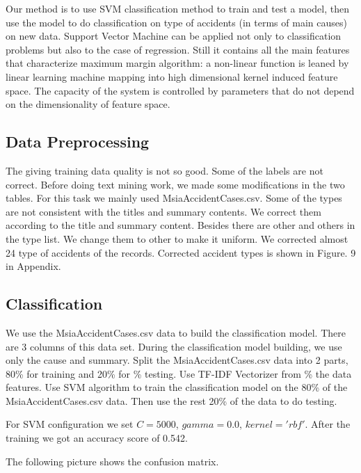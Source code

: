 \documentclass[DIV=calc, paper=a4, fontsize=11pt, twocolumn]{scrartcl}	 %
\begin{document}
Our method is to use SVM classification method to train and
test a model, then use the model to do classification on type of
accidents (in terms of main causes) on new data. Support Vector
Machine can be applied not only to classification problems but also to
the case of regression. Still it contains all the main features that
characterize maximum margin algorithm: a non-linear function is leaned
by linear learning machine mapping into high dimensional kernel
induced feature space. The capacity of the system is controlled by
parameters that do not depend on the dimensionality of feature space.




\subsection{Data Preprocessing}
The giving training data quality is not so good. Some of the labels
are not correct. Before doing text mining work, we made some
modifications in the two tables. For this task we mainly used
MsiaAccidentCases.csv. Some of the types are not consistent with the
titles and summary contents. We correct them according to the title
and summary content. Besides there are other and others in the type
list. We change them to other to make it uniform. We corrected almost 24
type of accidents of the records. Corrected accident types is shown in
Figure. 9 in Appendix.

\subsection{Classification}
\label{classification}

We use the MsiaAccidentCases.csv data to build the classification
model. There are 3 columns of this data set. During the classification
model building, we use only the cause and summary. Split the
MsiaAccidentCases.csv data into 2 parts, 80\% for training and 20\% for
                                \% testing. Use TF-IDF Vectorizer from
                                \% the data features.
Use SVM algorithm to train the classification model on the 80\% of the MsiaAccidentCases.csv data. Then use the rest 20\% of the data to do testing.


For SVM configuration we set $C = 5000$, $gamma = 0.0$, $kernel =
'rbf'$. After the training we got an accuracy score of 0.542.

The following picture shows the confusion matrix.
\end{document}
